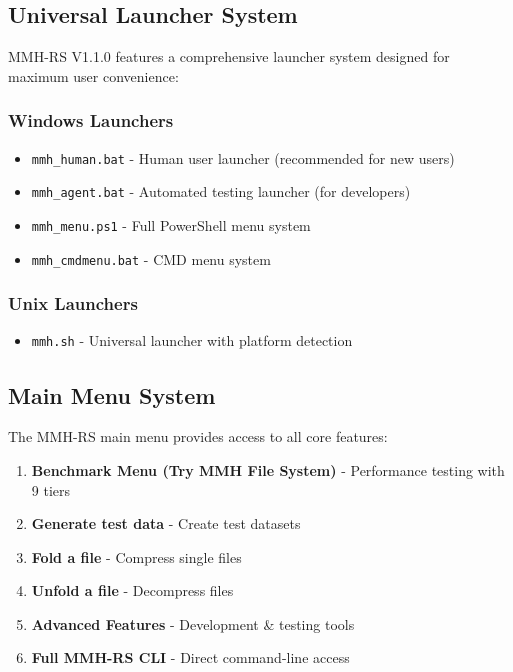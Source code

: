 \documentclass[11pt,a4paper]{article}
\begin{document}
	\subsection{Universal Launcher System}

	MMH-RS V1.1.0 features a comprehensive launcher system designed for maximum user convenience:

	\subsubsection{Windows Launchers}
	\begin{itemize}
		\item \texttt{mmh\_human.bat} - Human user launcher (recommended for new users)
		\item \texttt{mmh\_agent.bat} - Automated testing launcher (for developers)
		\item \texttt{mmh\_menu.ps1} - Full PowerShell menu system
		\item \texttt{mmh\_cmdmenu.bat} - CMD menu system
	\end{itemize}

	\subsubsection{Unix Launchers}
	\begin{itemize}
		\item \texttt{mmh.sh} - Universal launcher with platform detection
	\end{itemize}

	\subsection{Main Menu System}

	The MMH-RS main menu provides access to all core features:

	\begin{enumerate}
		\item \textbf{Benchmark Menu (Try MMH File System)} - Performance testing with 9 tiers
		\item \textbf{Generate test data} - Create test datasets
		\item \textbf{Fold a file} - Compress single files
		\item \textbf{Unfold a file} - Decompress files
		\item \textbf{Advanced Features} - Development \& testing tools
		\item \textbf{Full MMH-RS CLI} - Direct command-line access
	\end{enumerate}
\end{document}
